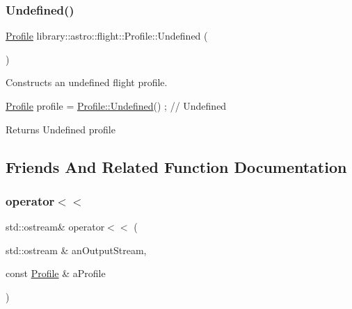 \subsubsection{\texorpdfstring{Undefined()}{Undefined()}}
{\footnotesize\ttfamily \hyperlink{classlibrary_1_1astro_1_1flight_1_1_profile}{Profile} library\+::astro\+::flight\+::\+Profile\+::\+Undefined (\begin{DoxyParamCaption}{ }\end{DoxyParamCaption})\hspace{0.3cm}{\ttfamily [static]}}



Constructs an undefined flight profile. 


\begin{DoxyCode}
\hyperlink{classlibrary_1_1astro_1_1flight_1_1_profile_a34d66fdddf3eda9a3fed036d6b9a4363}{Profile} profile = \hyperlink{classlibrary_1_1astro_1_1flight_1_1_profile_a1d3924edd09ed4d5ffe0a22bfa75fb38}{Profile::Undefined}() ; \textcolor{comment}{// Undefined}
\end{DoxyCode}


\begin{DoxyReturn}{Returns}
Undefined profile 
\end{DoxyReturn}


\subsection{Friends And Related Function Documentation}
\mbox{\label{classlibrary_1_1astro_1_1flight_1_1_profile_a8747e69fc10f1b068a0dd02d79da3b95}} 
\subsubsection{\texorpdfstring{operator$<$$<$}{operator<<}}
{\footnotesize\ttfamily std\+::ostream\& operator$<$$<$ (\begin{DoxyParamCaption}\item[{std\+::ostream \&}]{an\+Output\+Stream,  }\item[{const \hyperlink{classlibrary_1_1astro_1_1flight_1_1_profile}{Profile} \&}]{a\+Profile }\end{DoxyParamCaption})\hspace{0.3cm}{\ttfamily [friend]}}




